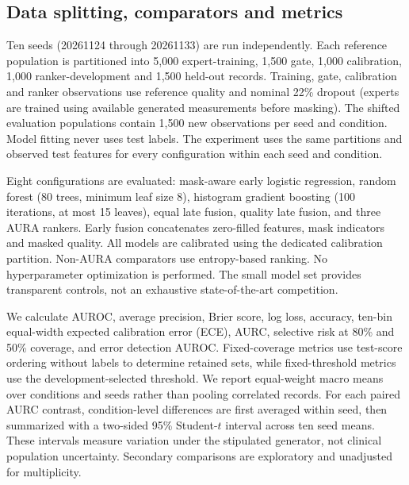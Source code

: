 \documentclass[conference]{IEEEtran}
\begin{document}
\subsection{Data splitting, comparators and metrics}
Ten seeds (20261124 through 20261133) are run independently. Each reference population is partitioned into 5,000 expert-training, 1,500 gate, 1,000 calibration, 1,000 ranker-development and 1,500 held-out records. Training, gate, calibration and ranker observations use reference quality and nominal 22\% dropout (experts are trained using available generated measurements before masking). The shifted evaluation populations contain 1,500 new observations per seed and condition. Model fitting never uses test labels. The experiment uses the same partitions and observed test features for every configuration within each seed and condition.

Eight configurations are evaluated: mask-aware early logistic regression, random forest (80 trees, minimum leaf size 8), histogram gradient boosting (100 iterations, at most 15 leaves), equal late fusion, quality late fusion, and three AURA rankers. Early fusion concatenates zero-filled features, mask indicators and masked quality. All models are calibrated using the dedicated calibration partition. Non-AURA comparators use entropy-based ranking. No hyperparameter optimization is performed. The small model set provides transparent controls, not an exhaustive state-of-the-art competition.

We calculate AUROC, average precision, Brier score, log loss, accuracy, ten-bin equal-width expected calibration error (ECE), AURC, selective risk at 80\% and 50\% coverage, and error detection AUROC. Fixed-coverage metrics use test-score ordering without labels to determine retained sets, while fixed-threshold metrics use the development-selected threshold. We report equal-weight macro means over conditions and seeds rather than pooling correlated records. For each paired AURC contrast, condition-level differences are first averaged within seed, then summarized with a two-sided 95\% Student-$t$ interval across ten seed means. These intervals measure variation under the stipulated generator, not clinical population uncertainty. Secondary comparisons are exploratory and unadjusted for multiplicity.
\end{document}
